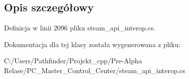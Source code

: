\subsection{Opis szczegółowy}


Definicja w linii 2096 pliku steam\+\_\+api\+\_\+interop.\+cs.



Dokumentacja dla tej klasy została wygenerowana z pliku\+:\begin{DoxyCompactItemize}
\item 
C\+:/\+Users/\+Pathfinder/\+Projekt\+\_\+cpp/\+Pre-\/\+Alpha Relase/\+P\+C\+\_\+\+Master\+\_\+\+Control\+\_\+\+Center/steam\+\_\+api\+\_\+interop.\+cs\end{DoxyCompactItemize}
